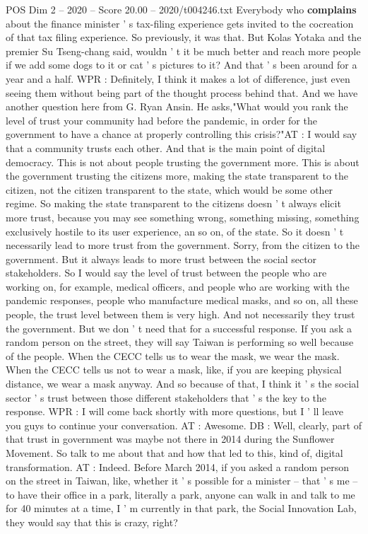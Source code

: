 \begin{textsample}{POS Dim 2 – 2020 – Score 20.00 – 2020/t004246.txt}
Everybody who \textbf{complains} about the finance minister ' s tax-filing experience gets invited to the cocreation of that tax filing experience.
So previously, it was that.
But Kolas Yotaka and the premier Su Tseng-chang said, wouldn ' t it be much better and reach more people if we add some dogs to it or cat ' s pictures to it?
And that ' s been around for a year and a half.
WPR : Definitely, I think it makes a lot of difference, just even seeing them without being part of the thought process behind that.
And we have another question here from G.
Ryan Ansin.
He asks,"What would you rank the level of trust your community had before the pandemic, in order for the government to have a chance at properly controlling this crisis?"AT : I would say that a community trusts each other.
And that is the main point of digital democracy.
This is not about people trusting the government more.
This is about the government trusting the citizens more, making the state transparent to the citizen, not the citizen transparent to the state, which would be some other regime.
So making the state transparent to the citizens doesn ' t always elicit more trust, because you may see something wrong, something missing, something exclusively hostile to its user experience, an so on, of the state.
So it doesn ' t necessarily lead to more trust from the government.
Sorry, from the citizen to the government.
But it always leads to more trust between the social sector stakeholders.
So I would say the level of trust between the people who are working on, for example, medical officers, and people who are working with the pandemic responses, people who manufacture medical masks, and so on, all these people, the trust level between them is very high.
And not necessarily they trust the government.
But we don ' t need that for a successful response.
If you ask a random person on the street, they will say Taiwan is performing so well because of the people.
When the CECC tells us to wear the mask, we wear the mask.
When the CECC tells us not to wear a mask, like, if you are keeping physical distance, we wear a mask anyway.
And so because of that, I think it ' s the social sector ' s trust between those different stakeholders that ' s the key to the response.
WPR : I will come back shortly with more questions, but I ' ll leave you guys to continue your conversation.
AT : Awesome.
DB : Well, clearly, part of that trust in government was maybe not there in 2014 during the Sunflower Movement.
So talk to me about that and how that led to this, kind of, digital transformation.
AT : Indeed.
Before March 2014, if you asked a random person on the street in Taiwan, like, whether it ' s possible for a minister -- that ' s me -- to have their office in a park, literally a park, anyone can walk in and talk to me for 40 minutes at a time, I ' m currently in that park, the Social Innovation Lab, they would say that this is crazy, right?

\end{textsample}
